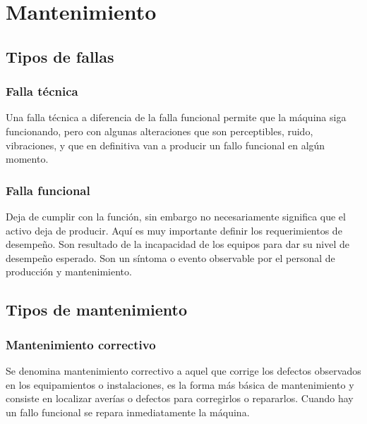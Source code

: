 \documentclass[../main]{subfiles}
\begin{document}
\chapter{Mantenimiento}

\section{Tipos de fallas}

\subsection{Falla técnica}
Una falla técnica a diferencia de la falla funcional permite que la máquina siga funcionando, pero con algunas alteraciones que son perceptibles, ruido, vibraciones, y que en definitiva van a producir un fallo funcional en algún momento.

\subsection{Falla funcional}
Deja de cumplir con la función, sin embargo no necesariamente significa que el activo deja de producir. Aquí es muy importante definir los requerimientos de desempeño. Son resultado de la incapacidad de los equipos para dar su nivel de desempeño esperado. Son un síntoma o evento observable por el personal de producción y mantenimiento.

\section{Tipos de mantenimiento}

\subsection{Mantenimiento correctivo}

Se denomina mantenimiento correctivo a aquel que corrige los defectos observados en los equipamientos o instalaciones, es la forma más básica de mantenimiento y consiste en localizar averías o defectos para corregirlos o repararlos. Cuando hay un fallo funcional se repara inmediatamente la máquina.
\end{document}
